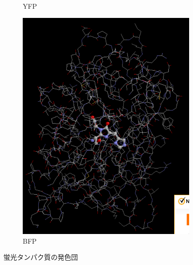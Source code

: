 \documentclass[a4paper,11pt, titlepage]{jsarticle}
\begin{document}
\begin{figure}[htbp]
\begin{subfigure}{0.3\columnwidth}
      \caption{YFP}
      \label{fig:YFP}
  \end{subfigure}
  \begin{subfigure}{0.3\columnwidth}
      \centering
      \includegraphics[width=\columnwidth]{BFP_close.png}
      \caption{BFP}
      \label{fig:BFP}
  \end{subfigure}    
  \caption{蛍光タンパク質の発色団}
  \label{fig:proteins}
\end{figure}
\end{document}
